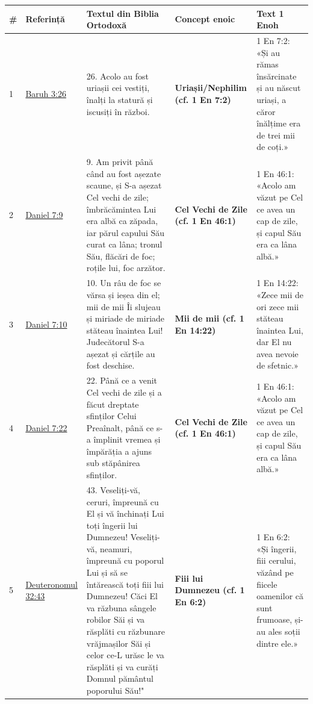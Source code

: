 \documentclass[12pt,a4paper,twoside,openany]{book}
\begin{document}
\footnotesize
\begin{longtable}{L{0.8cm}L{0.8cm}L{8.4cm}L{0.9cm}L{3.6cm}}
\toprule
{}
\textbf{\#} & \textbf{Referință} & \textbf{Textul din Biblia Ortodoxă} & \textbf{Concept enoic} & \textbf{Text 1 Enoh} \\
\midrule
\endhead
{}
1 & \href{https://bibliaortodoxa.ro/carte.php?id=8\&cap=3\#26}{Baruh 3:26} & 26. Acolo au fost uriașii cei vestiți, înalți la statură și iscusiți în război. & \textbf{Uriașii/Nephilim (cf. 1 En 7:2)} & 1 En 7:2: «Și au rămas însărcinate și au născut uriași, a căror înălțime era de trei mii de coți.» \\
2 & \href{https://bibliaortodoxa.ro/carte.php?id=16\&cap=7\#9}{Daniel 7:9} & 9. Am privit până când au fost așezate scaune, și S-a așezat Cel vechi de zile; îmbrăcămintea Lui era albă ca zăpada, iar părul capului Său curat ca lâna; tronul Său, flăcări de foc; roțile lui, foc arzător. & \textbf{Cel Vechi de Zile (cf. 1 En 46:1)} & 1 En 46:1: «Acolo am văzut pe Cel ce avea un cap de zile, și capul Său era ca lâna albă.» \\
3 & \href{https://bibliaortodoxa.ro/carte.php?id=16\&cap=7\#10}{Daniel 7:10} & 10. Un râu de foc se vărsa și ieșea din el; mii de mii Îi slujeau și miriade de miriade stăteau înaintea Lui! Judecătorul S-a așezat și cărțile au fost deschise. & \textbf{Mii de mii (cf. 1 En 14:22)} & 1 En 14:22: «Zece mii de ori zece mii stăteau înaintea Lui, dar El nu avea nevoie de sfetnic.» \\
4 & \href{https://bibliaortodoxa.ro/carte.php?id=16\&cap=7\#22}{Daniel 7:22} & 22. Până ce a venit Cel vechi de zile și a făcut dreptate sfinților Celui Preaînalt, până ce s-a împlinit vremea și împărăția a ajuns sub stăpânirea sfinților. & \textbf{Cel Vechi de Zile (cf. 1 En 46:1)} & 1 En 46:1: «Acolo am văzut pe Cel ce avea un cap de zile, și capul Său era ca lâna albă.» \\
5 & \href{https://bibliaortodoxa.ro/carte.php?id=17\&cap=32\#43}{Deuteronomul 32:43} & 43. Veseliți-vă, ceruri, împreună cu El și vă închinați Lui toți îngerii lui Dumnezeu! Veseliți-vă, neamuri, împreună cu poporul Lui și să se întărească toți fiii lui Dumnezeu! Căci El va răzbuna sângele robilor Săi și va răsplăti cu răzbunare vrăjmașilor Săi și celor ce-L urăsc le va răsplăti și va curăți Domnul pământul poporului Său!" & \textbf{Fiii lui Dumnezeu (cf. 1 En 6:2)} & 1 En 6:2: «Și îngerii, fiii cerului, văzând pe fiicele oamenilor că sunt frumoase, și-au ales soții dintre ele.» \\

\end{longtable}
\end{document}
